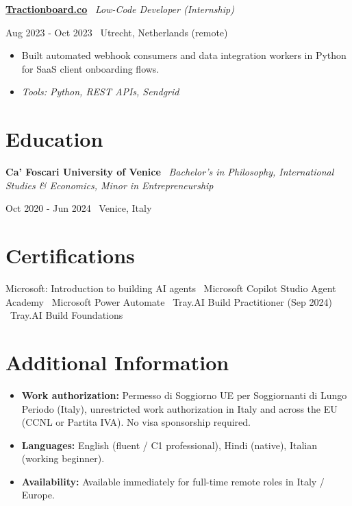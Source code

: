\documentclass[a4paper,10pt]{article}
\newcommand{\role}[4]{%
  \vspace{2pt}\noindent
  \begin{minipage}[t]{0.70\textwidth}\raggedright\textbf{#1} \textbullet\ \textit{#3}\end{minipage}%
  \hfill
  \begin{minipage}[t]{0.28\textwidth}\raggedleft\footnotesize\color{gray}#2 \textbullet\ #4\end{minipage}%
  \vspace{1pt}%
}
\begin{document}
\role{\href{https://tractionboard.co}{Tractionboard.co}}{Aug 2023 - Oct 2023}{Low-Code Developer (Internship)}{Utrecht, Netherlands (remote)}
\begin{itemize}
  \item Built automated webhook consumers and data integration workers in Python for SaaS client onboarding flows.
  \item \textit{Tools: Python, REST APIs, Sendgrid}
\end{itemize}

\section{Education}
\role{Ca' Foscari University of Venice}{Oct 2020 - Jun 2024}{Bachelor's in Philosophy, International Studies \& Economics, Minor in Entrepreneurship}{Venice, Italy}

\section{Certifications}
Microsoft: Introduction to building AI agents \textbullet\ Microsoft Copilot Studio Agent Academy \textbullet\ Microsoft Power Automate \textbullet\ Tray.AI Build Practitioner (Sep 2024) \textbullet\ Tray.AI Build Foundations

\section{Additional Information}
\begin{itemize}
  \item \textbf{Work authorization:} Permesso di Soggiorno UE per Soggiornanti di Lungo Periodo (Italy), unrestricted work authorization in Italy and across the EU (CCNL or Partita IVA). No visa sponsorship required.
  \item \textbf{Languages:} English (fluent / C1 professional), Hindi (native), Italian (working beginner).
  \item \textbf{Availability:} Available immediately for full-time remote roles in Italy / Europe.
\end{itemize}

\end{document}
